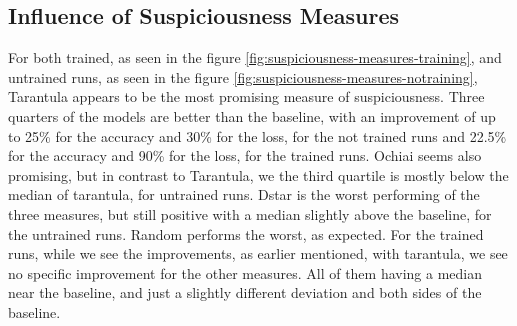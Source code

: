 \subsection{Influence of Suspiciousness Measures}\label{subsec:influence-of-suspiciousness-measures}
For both trained, as seen in the figure \ref{fig:suspiciousness-measures-training}, and untrained runs, as seen in the figure \ref{fig:suspiciousness-measures-notraining}, Tarantula appears to be the most promising measure of suspiciousness.
Three quarters of the models are better than the baseline, with an improvement of up to 25\% for the accuracy and 30\% for the loss, for the not trained runs and 22.5\% for the accuracy and 90\% for the loss, for the trained runs.
Ochiai seems also promising, but in contrast to Tarantula, we the third quartile is mostly below the median of tarantula, for untrained runs.
Dstar is the worst performing of the three measures, but still positive with a median slightly above the baseline, for the untrained runs.
Random performs the worst, as expected.
For the trained runs, while we see the improvements, as earlier mentioned, with tarantula, we see no specific improvement for the other measures.
All of them having a median near the baseline, and just a slightly different deviation and both sides of the baseline.

